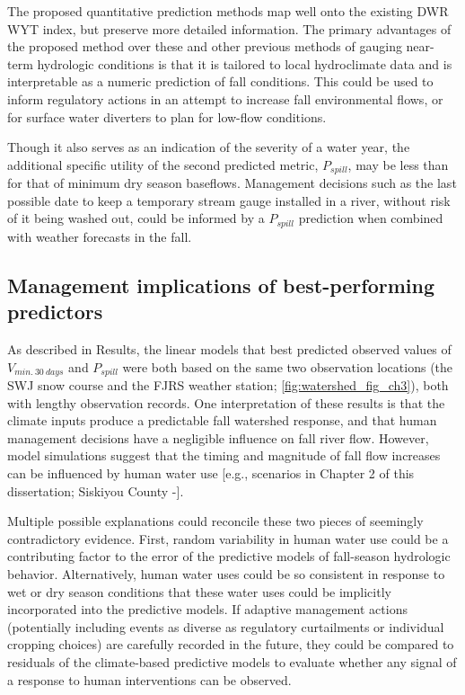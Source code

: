 \documentclass[hess, manuscript]{copernicus}
\begin{document}
The proposed quantitative prediction methods map well onto the existing
DWR WYT index, but preserve more detailed information. The primary
advantages of the proposed method over these and other previous methods
of gauging near-term hydrologic conditions is that it is tailored to
local hydroclimate data and is interpretable as a numeric prediction of
fall conditions. This could be used to inform regulatory actions in an
attempt to increase fall environmental flows, or for surface water
diverters to plan for low-flow conditions.

Though it also serves as an indication of the severity of a water year,
the additional specific utility of the second predicted metric,
\(P_{spill}\), may be less than for that of minimum dry season
baseflows. Management decisions such as the last possible date to keep a
temporary stream gauge installed in a river, without risk of it being
washed out, could be informed by a \(P_{spill}\) prediction when
combined with weather forecasts in the fall.

\subsection{Management implications of best-performing predictors}

As described in Results, the linear models that best predicted observed
values of \(V_{min.~30~days}\) and \(P_{spill}\) were both based on the
same two observation locations (the SWJ snow course and the FJRS weather
station; \autoref{fig:watershed_fig_ch3}), both with lengthy observation
records. One interpretation of these results is that the climate inputs
produce a predictable fall watershed response, and that human management
decisions have a negligible influence on fall river flow. However, model
simulations suggest that the timing and magnitude of fall flow increases
can be influenced by human water use {[}e.g., scenarios in Chapter 2 of
this dissertation; Siskiyou County -\citet{SiskiyouCounty2021}{]}.

Multiple possible explanations could reconcile these two pieces of
seemingly contradictory evidence. First, random variability in human
water use could be a contributing factor to the error of the predictive
models of fall-season hydrologic behavior. Alternatively, human water
uses could be so consistent in response to wet or dry season conditions
that these water uses could be implicitly incorporated into the
predictive models. If adaptive management actions (potentially including
events as diverse as regulatory curtailments or individual cropping
choices) are carefully recorded in the future, they could be compared to
residuals of the climate-based predictive models to evaluate whether any
signal of a response to human interventions can be observed.
\end{document}
